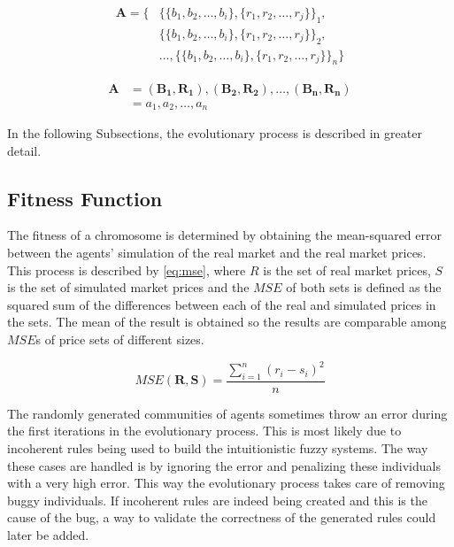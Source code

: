 \begin{equation}
  \label{eq:communities-of-agents}
  \begin{split}
    \bm{A} = \{&\{\{b_1, b_2, \ldots, b_i\}, \{r_1, r_2, \ldots, r_j\}\}_1, \\
               &\{\{b_1, b_2, \ldots, b_i\}, \{r_1, r_2, \ldots, r_j\}\}_2, \\
               &\ldots, \{\{b_1, b_2, \ldots, b_i\}, \{r_1, r_2, \ldots, r_j\}\}_n\}
  \end{split}
\end{equation}

\begin{equation}
  \label{eq:communities-of-agents-2}
  \begin{split}
    \bm{A} &= {(\bm{B_{1}}, \bm{R_{1}}), (\bm{B_{2}}, \bm{R_{2}}), \ldots, (\bm{B_{n}}, \bm{R_{n}})} \\
           &= {a_{1}, a_{2}, \dots, a_{n}}
  \end{split}
\end{equation}

In the following Subsections, the evolutionary process is described in greater
detail.

\subsection{Fitness Function}
\label{subsection:fitness-function}

The fitness of a chromosome is determined by obtaining the mean-squared error
between the agents' simulation of the real market and the real market
prices. This process is described by \ref{eq:mse}, where $R$ is the set of real
market prices, $S$ is the set of simulated market prices and the $MSE$ of both
sets is defined as the squared sum of the differences between each of the real and
simulated prices in the sets. The mean of the result is obtained so the results
are comparable among $MSE$s of price sets of different sizes.

\begin{equation}
  \label{eq:mse}
  MSE(\bm{R}, \bm{S}) = \frac{\sum_{i=1}^n(r_i-s_i)^2}{n}
\end{equation}

The randomly generated communities of agents sometimes throw an error during the
first iterations in the evolutionary process. This is most likely due to
incoherent rules being used to build the intuitionistic fuzzy systems. The way
these cases are handled is by ignoring the error and penalizing these
individuals with a very high error. This way the evolutionary process takes care
of removing buggy individuals. If incoherent rules are indeed being created and
this is the cause of the bug, a way to validate the correctness of the generated
rules could later be added.

